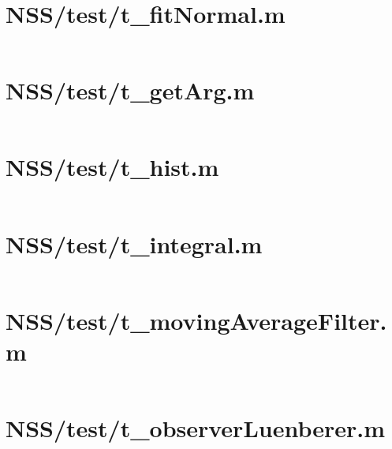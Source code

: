 \pagebreak
\section*{NSS/test/t\_fitNormal.m}\label{code:NSS/test/t_fitNormal.m}
\inputminted[linenos,fontsize=\scriptsize]{matlab}{/home/dcouture/git/mathyourlife/TSatPy/beta_versions/matlab_object_oriented/test/t_fitNormal.m}

\pagebreak
\section*{NSS/test/t\_getArg.m}\label{code:NSS/test/t_getArg.m}
\inputminted[linenos,fontsize=\scriptsize]{matlab}{/home/dcouture/git/mathyourlife/TSatPy/beta_versions/matlab_object_oriented/test/t_getArg.m}

\pagebreak
\section*{NSS/test/t\_hist.m}\label{code:NSS/test/t_hist.m}
\inputminted[linenos,fontsize=\scriptsize]{matlab}{/home/dcouture/git/mathyourlife/TSatPy/beta_versions/matlab_object_oriented/test/t_hist.m}

\pagebreak
\section*{NSS/test/t\_integral.m}\label{code:NSS/test/t_integral.m}
\inputminted[linenos,fontsize=\scriptsize]{matlab}{/home/dcouture/git/mathyourlife/TSatPy/beta_versions/matlab_object_oriented/test/t_integral.m}

\pagebreak
\section*{NSS/test/t\_movingAverageFilter.m}\label{code:NSS/test/t_movingAverageFilter.m}
\inputminted[linenos,fontsize=\scriptsize]{matlab}{/home/dcouture/git/mathyourlife/TSatPy/beta_versions/matlab_object_oriented/test/t_movingAverageFilter.m}

\pagebreak
\section*{NSS/test/t\_observerLuenberer.m}\label{code:NSS/test/t_observerLuenberer.m}
\inputminted[linenos,fontsize=\scriptsize]{matlab}{/home/dcouture/git/mathyourlife/TSatPy/beta_versions/matlab_object_oriented/test/t_observerLuenberer.m}

